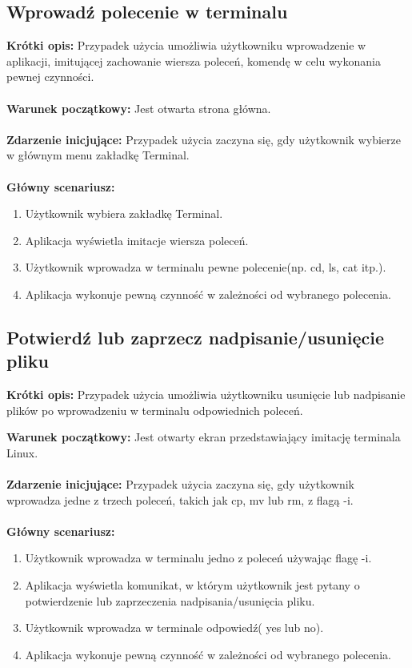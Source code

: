 \documentclass[10pt,a4paper]{report}
\begin{document}
\begin{adjustwidth}{2cm}{2cm}
\subsection{Wprowadź polecenie w terminalu}
\begin{minipage}{1\linewidth}
\textbf{Krótki opis:} Przypadek użycia umożliwia użytkowniku wprowadzenie w aplikacji, imitującej zachowanie wiersza poleceń, komendę w celu wykonania pewnej czynności. \\ \\
\textbf{Warunek początkowy:} Jest otwarta strona główna. \\ \\
\textbf{Zdarzenie inicjujące:} Przypadek użycia zaczyna się, gdy użytkownik wybierze w głównym menu zakładkę Terminal. \\ \\
\textbf{Główny scenariusz:} 
\begin{enumerate}
\setlength\itemsep{0.2cm}
    \item Użytkownik wybiera zakładkę Terminal.
    \item Aplikacja wyświetla imitacje wiersza poleceń.
    \item Użytkownik wprowadza w terminalu pewne polecenie(np. cd, ls, cat itp.).
    \item Aplikacja wykonuje pewną czynność w zależności od wybranego polecenia.
\end{enumerate}
\end{minipage}
\subsection{Potwierdź lub zaprzecz nadpisanie/usunięcie pliku}
\begin{minipage}{1\linewidth}
\textbf{Krótki opis:} Przypadek użycia umożliwia użytkowniku usunięcie lub nadpisanie plików po wprowadzeniu w terminalu odpowiednich poleceń.
\end{minipage}
\begin{minipage}{1\linewidth}
\textbf{Warunek początkowy:} Jest otwarty ekran przedstawiający imitację terminala Linux. \\ \\
\textbf{Zdarzenie inicjujące:} Przypadek użycia zaczyna się, gdy  użytkownik wprowadza jedne z trzech poleceń, takich jak cp, mv lub rm, z flagą -i. \\ \\
\textbf{Główny scenariusz:} 
\begin{enumerate}
\setlength\itemsep{0.2cm}
    \item Użytkownik wprowadza w terminalu jedno z poleceń używając flagę -i.
    \item Aplikacja wyświetla komunikat, w którym użytkownik jest pytany o potwierdzenie lub zaprzeczenia nadpisania/usunięcia pliku.
    \item Użytkownik wprowadza w terminale odpowiedź( yes lub no).
    \item Aplikacja wykonuje pewną czynność w zależności od wybranego polecenia.
\end{enumerate}
\end{minipage}

\end{adjustwidth}
\end{document}
